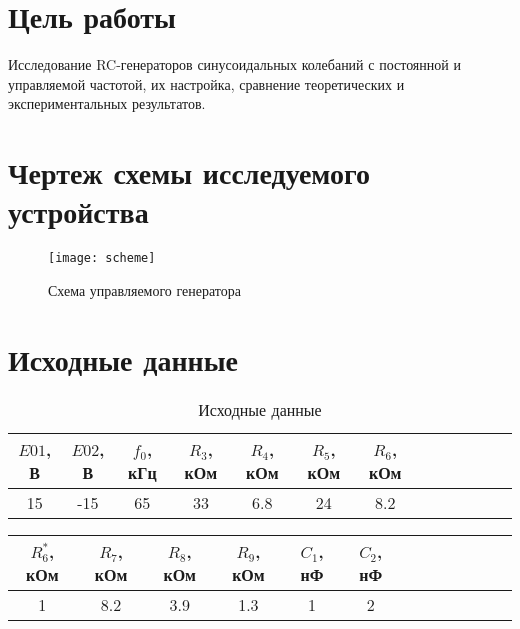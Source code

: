 





\section{Цель работы}

Исследование RC-генераторов синусоидальных колебаний с постоянной и управляемой частотой, их настройка, сравнение теоретических и экспериментальных результатов.

\section{Чертеж схемы исследуемого устройства}

\begin{figure}[H]
\begin{center}
	\texttt{[image: scheme]}
	\caption{Схема управляемого генератора}
\end{center}
\end{figure}

\section{Исходные данные}

\begin{table}[H]
\begin{center}
	\caption{Исходные данные}
	\def\tabcolsep{8pt}
	\begin{tabular}{|c|c|c|c|c|c|c|c|c|c|c|c|c|}
		\hline
		$E{01}$, В &
		$E{02}$, В &
		$f_0$, кГц &
		$R_3$, кОм &
		$R_4$, кОм &
		$R_5$, кОм &
		$R_6$, кОм \\
		\hline
		15 &
		-15 &
		65 &
		33 &
		6.8 &
		24 &
		8.2 \\
	    \hline	
	\end{tabular}
\end{center}
\end{table}

\begin{table}[H]
\begin{center}
	\def\tabcolsep{8pt}
	\begin{tabular}{|c|c|c|c|c|c|c|c|c|c|c|c|c|}
		\hline
		$R_6^*$, кОм &
		$R_7$, кОм &
		$R_8$, кОм &
		$R_9$, кОм &
		$C_1$, нФ &
		$C_2$, нФ \\
		\hline
		1 &
		8.2 &
		3.9 &
		1.3 &
		1 &
		2 \\
	    \hline	
	\end{tabular}
\end{center}
\end{table}

